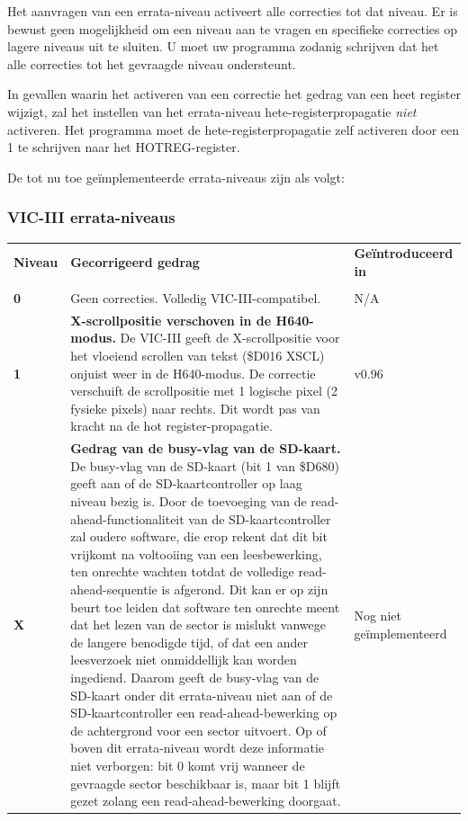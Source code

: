 Het aanvragen van een errata-niveau activeert alle correcties tot dat niveau. Er is bewust geen mogelijkheid om een niveau aan te vragen en specifieke correcties op lagere niveaus uit te sluiten. U moet uw programma zodanig schrijven dat het alle correcties tot het gevraagde niveau ondersteunt.

In gevallen waarin het activeren van een correctie het gedrag van een heet register wijzigt, zal het instellen van het errata-niveau hete-registerpropagatie {\em{niet}} activeren. Het programma moet de hete-registerpropagatie zelf activeren door een 1 te schrijven naar het HOTREG-register.

De tot nu toe geïmplementeerde errata-niveaus zijn als volgt:

\subsubsection{VIC-III errata-niveaus}

\begin{longtable}{|p{1.5cm}|p{7.1cm}|p{2.5cm}|}
\hhline{---}
{\bf{Niveau}} & {\bf{Gecorrigeerd gedrag}} & {\bf{Ge\"introduceerd in}} \\
\hhline{---}
\endhead
\multicolumn{3}{l@{}}{vervolg \ldots}\\
\endfoot
\hline
\endlastfoot

{\bf{0}} & Geen correcties. Volledig VIC-III-compatibel. & N/A \\

\hline
{\bf{1}} & {\bf{X-scrollpositie verschoven in de H640-modus.}} De VIC-III geeft de X-scrollpositie voor het vloeiend scrollen van tekst (\$D016 XSCL) onjuist weer in de H640-modus. De correctie verschuift de scrollpositie met 1 logische pixel (2 fysieke pixels) naar rechts. Dit wordt pas van kracht na de hot register-propagatie. &v0.96 \\

\hline
{\bf{X}} & {\bf{Gedrag van de busy-vlag van de SD-kaart.}} De busy-vlag van de SD-kaart (bit 1 van \$D680) geeft aan of de SD-kaartcontroller op laag niveau bezig is. Door de toevoeging van de read-ahead-functionaliteit van de SD-kaartcontroller zal oudere software, die erop rekent dat dit bit vrijkomt na voltooiing van een leesbewerking, ten onrechte wachten totdat de volledige read-ahead-sequentie is afgerond. Dit kan er op zijn beurt toe leiden dat software ten onrechte meent dat het lezen van de sector is mislukt vanwege de langere benodigde tijd, of dat een ander leesverzoek niet onmiddellijk kan worden ingediend. Daarom geeft de busy-vlag van de SD-kaart onder dit errata-niveau niet aan of de SD-kaartcontroller een read-ahead-bewerking op de achtergrond voor een sector uitvoert. Op of boven dit errata-niveau wordt deze informatie niet verborgen: bit 0 komt vrij wanneer de gevraagde sector beschikbaar is, maar bit 1 blijft gezet zolang een read-ahead-bewerking doorgaat. &Nog niet geïmplementeerd \\

\end{longtable}


